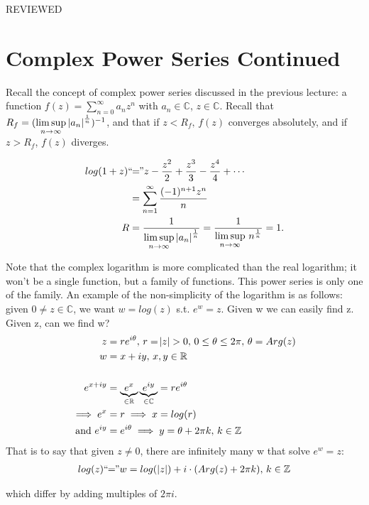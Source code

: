 
\setcounter{section}{0}
\setcounter{theorem}{0}


REVIEWED
\section{Complex Power Series Continued}

Recall the concept of complex power series discussed in the previous lecture: a function $f(z) = \sum_{n=0}^\infty a_nz^n$ with $a_n \in \mathbb{C}$, $z\in \mathbb{C}$. Recall that $R_f=( \limsup\limits_{n\rightarrow \infty} \, \abs{a_n}^\frac{1}{n} )^{-1}$, and that if $z<R_f, \, f(z)$ converges absolutely, and if $z>R_f$, $f(z)$ diverges.

\begin{example}[Logarithm]
\begin{align*}
    log(1+z)  `` \! \! &= \! \!"  z - \frac{z^2}{2} +\frac{z^3}{3} - \frac{z^4}{4} + \cdots\\
    &= \sum_{n=1}^\infty \frac{(-1)^{n+1}z^n}{n}\\
    R&=\frac{1}{\limsup\limits_{n\rightarrow \infty} \, \abs{a_n}^\frac{1}{n}} = \frac{1}{\limsup\limits_{n\rightarrow \infty} \, n^\frac{1}{n}} = 1.
\end{align*}

Note that the complex logarithm is more complicated than the real logarithm; it won't be a single function, but a family of functions. This power series is only one of the family. An example of the non-simplicity of the logarithm is as follows: given $0 \neq z \in \mathbb{C}$, we want $w=log(z)$ s.t. $e^w=z$. Given w we can easily find z. Given z, can we find w?
\begin{align*}
    z&=re^{i\theta}, \, r=\abs{z}>0, \, 0 \leq \theta \leq 2\pi, \, \theta = Arg(z)\\
    w&=x+iy, \, x,y\in \mathbb{R}\\\\
    e^{x+iy} &= 
    \underbrace{e^x}_{\in \mathbb{R}} \underbrace{e^{iy}}_{\in \mathbb{C}} = re^{i\theta}\\ \implies e^x &=r \implies x=log(r)\\
   \text{and } e^{iy} &= e^{i\theta} \implies y = \theta +2\pi k, \, k\in \mathbb{Z}
\end{align*}
That is to say that given $z\neq 0$, there are infinitely many w that solve $e^w=z$:
\begin{align*}
    log(z) `` \! \! = \! \! " w = log ( \,  \abs{z} )  + i\cdot (Arg(z) +2\pi k), \, k\in \mathbb{Z}
\end{align*}


which differ by adding multiples of $2 \pi i$.
\end{example}

